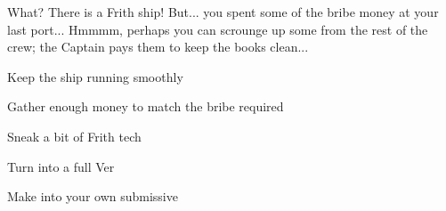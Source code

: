 \documentclass[char]{guildcamp4}
\begin{document}
What? There is a Frith ship! But... you spent some of the bribe money at your last port... Hmmmm, perhaps you can scrounge up some from the rest of the crew; the Captain pays them to keep the books clean...

\begin{itemz}[Goals]
	\item Keep the ship running smoothly
	\item Gather enough money to match the bribe required
	\item Sneak a bit of Frith tech
	\item Turn \cJulie{} into a full Ver
	\item Make \cJulie{} into your own submissive
\end{itemz}

\begin{itemz}[Notes]
	\item 
\end{itemz}

\begin{contacts}
	\contact{\cVone{}} 
	\contact{\cVthree{}}
	\contact{\cJoan{}}
	\contact{\cJulie{}}
	\contact{\cJames{}}
	\contact{\cRasputin{}}
	\contact{\cSpite{}}
	\contact{\cPlead{}}
\end{contacts}
\end{document}
